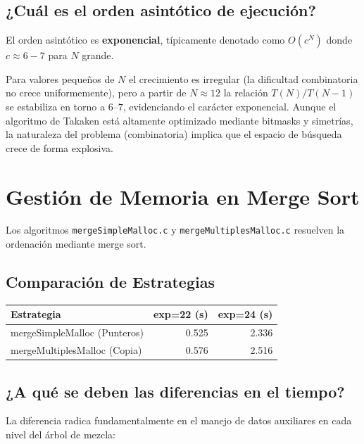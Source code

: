 \documentclass[11pt,a4paper]{article}
\begin{document}
\subsection*{¿Cuál es el orden asintótico de ejecución?}

El orden asintótico es \textbf{exponencial}, típicamente denotado como $O(c^N)$ donde $c \approx 6-7$ para $N$ grande.

Para valores pequeños de $N$ el crecimiento es irregular (la dificultad combinatoria no crece uniformemente), pero a partir de $N \approx 12$ la relación $T(N)/T(N-1)$ se estabiliza en torno a $6$--$7$, evidenciando el carácter exponencial. Aunque el algoritmo de Takaken está altamente optimizado mediante bitmasks y simetrías, la naturaleza del problema (combinatoria) implica que el espacio de búsqueda crece de forma explosiva.

\section{Gestión de Memoria en Merge Sort}

Los algoritmos \texttt{mergeSimpleMalloc.c} y \texttt{mergeMultiplesMalloc.c} resuelven la ordenación mediante merge sort.

\subsection*{Comparación de Estrategias}

\begin{center}
\begin{tabular}{|l|r|r|}
\hline
\textbf{Estrategia} & \textbf{exp=22 (s)} & \textbf{exp=24 (s)} \\
\hline
mergeSimpleMalloc (Punteros) & 0.525 & 2.336 \\
mergeMultiplesMalloc (Copia) & 0.576 & 2.516 \\
\hline
\end{tabular}
\end{center}

\subsection*{¿A qué se deben las diferencias en el tiempo?}

La diferencia radica fundamentalmente en el manejo de datos auxiliares en cada nivel del árbol de mezcla:
\end{document}
